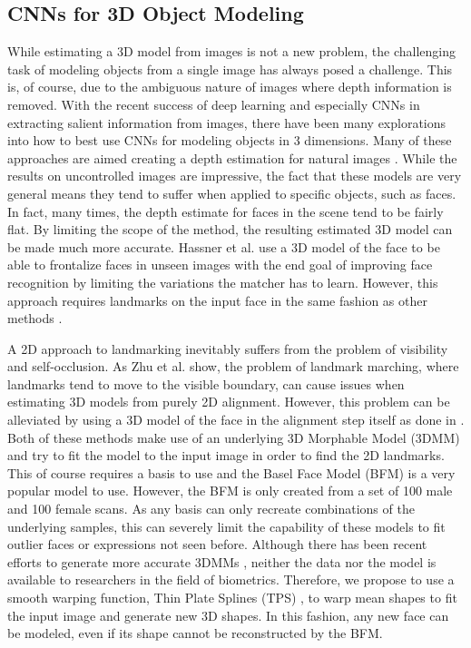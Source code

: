 \documentclass[10pt,twocolumn,letterpaper]{article}
\begin{document}
\subsection{CNNs for 3D Object Modeling}

While estimating a 3D model from images is not a new problem, the challenging task of modeling objects from a single image has always posed a challenge. This is, of course, due to the ambiguous nature of images where depth information is removed. With the recent success of deep learning and especially CNNs in extracting salient information from images, there have been many explorations into how to best use CNNs for modeling objects in 3 dimensions. Many of these approaches are aimed creating a depth estimation for natural images \cite{Liu16dfm, Bansal16marr, Roy16, Liu15dcnn, Li15dcrf}. While the results on uncontrolled images are impressive, the fact that these models are very general means they tend to suffer when applied to specific objects, such as faces. In fact, many times, the depth estimate for faces in the scene tend to be fairly flat. By limiting the scope of the method, the resulting estimated 3D model can be made much more accurate. Hassner et al. \cite{Hassner15eff} use a 3D model of the face to be able to frontalize faces in unseen images with the end goal of improving face recognition by limiting the variations the matcher has to learn. However, this approach requires landmarks on the input face in the same fashion as other methods \cite{jheo_gem_2009,GEM_2011,Hassner15eff,Masi16pafr,Zhu15hfpe}. 

A 2D approach to landmarking inevitably suffers from the problem of visibility and self-occlusion. As Zhu et al. \cite{Zhu15hfpe} show, the problem of landmark marching, where landmarks tend to move to the visible boundary, can cause issues when estimating 3D models from purely 2D alignment. However, this problem can be alleviated by using a 3D model of the face in the alignment step itself as done in \cite{Jourabloo15pifa, Zhu16falp}. Both of these methods make use of an underlying 3D Morphable Model (3DMM) and try to fit the model to the input image in order to find the 2D landmarks. This of course requires a basis to use and the Basel Face Model (BFM) \cite{bfm09} is a very popular model to use. However, the BFM is only created from a set of 100 male and 100 female scans. As any basis can only recreate combinations of the underlying samples, this can severely limit the capability of these models to fit outlier faces or expressions not seen before. Although there has been recent efforts to generate more accurate 3DMMs \cite{3dmm10k}, neither the data nor the model is available to researchers in the field of biometrics. Therefore, we propose to use a smooth warping function, Thin Plate Splines (TPS) \cite{Bookstein89}, to warp mean shapes to fit the input image and generate new 3D shapes. In this fashion, any new face can be modeled, even if its shape cannot be reconstructed by the BFM.
\end{document}
